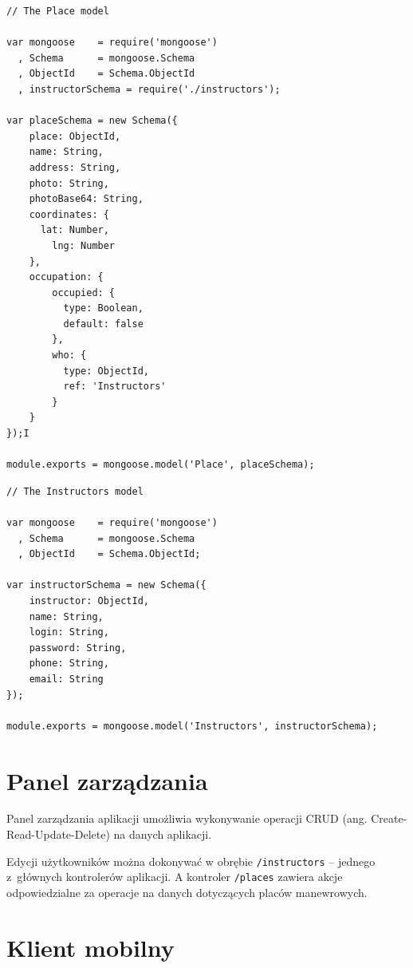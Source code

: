 \documentclass[twoside,a4paper,openright,12pt]{book}
\begin{document}
\begin{lstlisting}[frame=single,label={lst:model placów},caption=Schemat danych placów manewrowych -- plik: /models/places.js]
// The Place model

var mongoose 	= require('mongoose')
  ,	Schema 		= mongoose.Schema
  ,	ObjectId 	= Schema.ObjectId
  , instructorSchema = require('./instructors');

var placeSchema = new Schema({
    place: ObjectId,
    name: String,
    address: String,
    photo: String,
    photoBase64: String,
    coordinates: {
      lat: Number,
     	lng: Number
    },
    occupation: {
        occupied: { 
          type: Boolean,
          default: false 
        },
        who: { 
          type: ObjectId,
          ref: 'Instructors'
        }
    }
});I

module.exports = mongoose.model('Place', placeSchema);
\end{lstlisting}


\begin{lstlisting}[frame=single,label={lst:model instruktorów},caption=Schemat danych instruktorów -- plik: /models/instructors.js]
// The Instructors model

var mongoose 	= require('mongoose')
  ,	Schema 		= mongoose.Schema
  ,	ObjectId 	= Schema.ObjectId;

var instructorSchema = new Schema({
    instructor: ObjectId,
    name: String,
    login: String,
    password: String,
    phone: String,  
    email: String
});

module.exports = mongoose.model('Instructors', instructorSchema);
\end{lstlisting}


\section{Panel zarządzania}

Panel zarządzania aplikacji umożliwia wykonywanie operacji CRUD (ang. Create-Read-Update-Delete) na danych aplikacji.

Edycji użytkowników można dokonywać w obrębie \texttt{/instructors} -- jednego z~głównych kontrolerów aplikacji. A kontroler \texttt{/places} zawiera akcje odpowiedzialne za operacje na danych dotyczących placów manewrowych.


\section{Klient mobilny}
\end{document}
